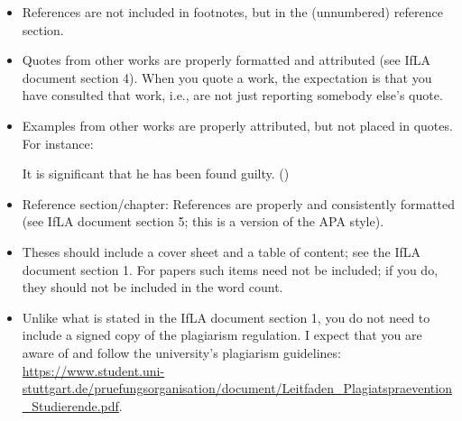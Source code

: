 \documentclass[11pt,fleqn,a4paper/thesis]{article}
\newcommand{\6}{\mbox{$[\hspace*{-.6mm}[$}}
\newcommand{\9}{\mbox{$]\hspace*{-.6mm}]$}}
\begin{document}
\begin{itemize}[itemsep=-1pt,leftmargin=2.5ex,topsep=-2pt]
\item References are not included in footnotes, but in the (unnumbered) reference section.

\item Quotes from other works are properly formatted and attributed (see IfLA document section 4). When you quote a work, the expectation is that you have consulted that work, i.e., are not just reporting somebody else's quote.

\item Examples from other works are properly attributed, but not placed in quotes. For instance:

\begin{exe}
\ex It is significant that he has been found guilty. \hfill (\citealt[144]{kiparsky-kiparsky70})
\end{exe}

\item Reference section/chapter: References are properly and consistently formatted (see IfLA document section 5; this is a version of the APA style).

\item Theses should include a cover sheet and a table of content; see the IfLA document section 1. For papers such items need not be included; if you do, they should not be included in the word count.

\item Unlike what is stated in the IfLA document section 1, you do not need to include a signed copy of the plagiarism regulation. I expect that you are aware of and follow the university's plagiarism guidelines: \url{https://www.student.uni-stuttgart.de/pruefungsorganisation/document/Leitfaden_Plagiatspraevention_Studierende.pdf}.

\end{itemize}
	


\end{document}
